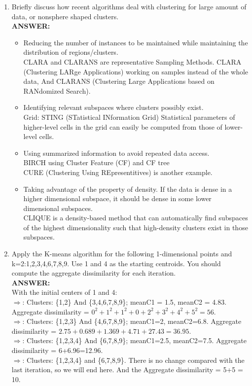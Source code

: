 \documentclass{article}
\begin{document}
\begin{enumerate}
\item Briefly discuss how recent algorithms deal with clustering for
  large amount of data, or nonsphere shaped clusters.  \\
\textbf{ANSWER:} \\

\begin{itemize}
\item Reducing the number of instances to be maintained
  while maintaining the distribution of regions/clusters.\\
  CLARA and CLARANS are representative Sampling Methods. 
  CLARA (Clustering LARge Applications) working on samples instead of
  the whole data, And CLARANS (Clustering Large Applications based on
  RANdomized Search).
  
\item Identifying relevant subspaces where clusters possibly exist.\\
  Grid: STING (STatistical INformation Grid) Statistical parameters of
  higher-level cells in the grid can easily be computed from those of
  lower-level cells.
  
\item Using summarized information to avoid repeated data access.\\
  BIRCH using Cluster Feature (CF) and CF tree \\
  CURE (Clustering Using REpresentitives) is another example. 
  
\item Taking advantage of the property of density. If the data is
  dense in a higher dimensional subspace, it should be dense in some
  lower dimensional subspaces. \\
  CLIQUE is a density-based method that can automatically find subspaces
  of the highest dimensionality such that high-density clusters exist in
  those subspaces.
\end{itemize}

\item Apply the K-means algorithm for the following 1-dimensional
  points and k=2:1,2,3,4,6,7,8,9. Use 1 and 4 as the starting
  centroids. You should compute the aggregate dissimilarity for each
  iteration. \\
\textbf{ANSWER:} \\
With the initial centers of 1 and 4: \\
$\Rightarrow$: Clusters: \{1,2\} And \{3,4,6,7,8,9\}; meanC1 = 1.5,
meanC2 = 4.83. Aggregate dissimilarity =
$0^2+1^2+1^2+0+2^2+3^2+4^2+5^2 = 56$. \\
$\Rightarrow$: Clusters: \{1,2,3\} And \{4,6,7,8,9\}; meanC1=2,
meanC2=6.8. Aggregate dissimilarity =
$2.75+0.689+1.369+4.71+27.43=36.95$. \\
$\Rightarrow$: Clusters: \{1,2,3,4\} And \{6,7,8,9\}; meanC1=2.5,
meanC2=7.5. Aggregate dissimilarity = 6+6.96=12.96. \\
$\Rightarrow$: Clusters: \{1,2,3,4\} and \{6,7,8,9\}. There is no change
compared with the last iteration, so we will end here. And the
Aggregate dissimilarity = 5+5 = 10. 


\end{enumerate}
\end{document}
